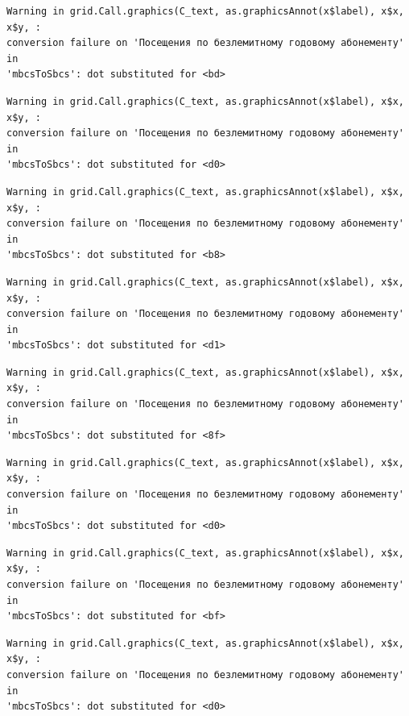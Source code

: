 \documentclass[
  letterpaper,
  DIV=11,
  numbers=noendperiod]{scrartcl}
\begin{document}
\begin{verbatim}
Warning in grid.Call.graphics(C_text, as.graphicsAnnot(x$label), x$x, x$y, :
conversion failure on 'Посещения по безлемитному годовому абонементу' in
'mbcsToSbcs': dot substituted for <bd>
\end{verbatim}

\begin{verbatim}
Warning in grid.Call.graphics(C_text, as.graphicsAnnot(x$label), x$x, x$y, :
conversion failure on 'Посещения по безлемитному годовому абонементу' in
'mbcsToSbcs': dot substituted for <d0>
\end{verbatim}

\begin{verbatim}
Warning in grid.Call.graphics(C_text, as.graphicsAnnot(x$label), x$x, x$y, :
conversion failure on 'Посещения по безлемитному годовому абонементу' in
'mbcsToSbcs': dot substituted for <b8>
\end{verbatim}

\begin{verbatim}
Warning in grid.Call.graphics(C_text, as.graphicsAnnot(x$label), x$x, x$y, :
conversion failure on 'Посещения по безлемитному годовому абонементу' in
'mbcsToSbcs': dot substituted for <d1>
\end{verbatim}

\begin{verbatim}
Warning in grid.Call.graphics(C_text, as.graphicsAnnot(x$label), x$x, x$y, :
conversion failure on 'Посещения по безлемитному годовому абонементу' in
'mbcsToSbcs': dot substituted for <8f>
\end{verbatim}

\begin{verbatim}
Warning in grid.Call.graphics(C_text, as.graphicsAnnot(x$label), x$x, x$y, :
conversion failure on 'Посещения по безлемитному годовому абонементу' in
'mbcsToSbcs': dot substituted for <d0>
\end{verbatim}

\begin{verbatim}
Warning in grid.Call.graphics(C_text, as.graphicsAnnot(x$label), x$x, x$y, :
conversion failure on 'Посещения по безлемитному годовому абонементу' in
'mbcsToSbcs': dot substituted for <bf>
\end{verbatim}

\begin{verbatim}
Warning in grid.Call.graphics(C_text, as.graphicsAnnot(x$label), x$x, x$y, :
conversion failure on 'Посещения по безлемитному годовому абонементу' in
'mbcsToSbcs': dot substituted for <d0>
\end{verbatim}
\end{document}
